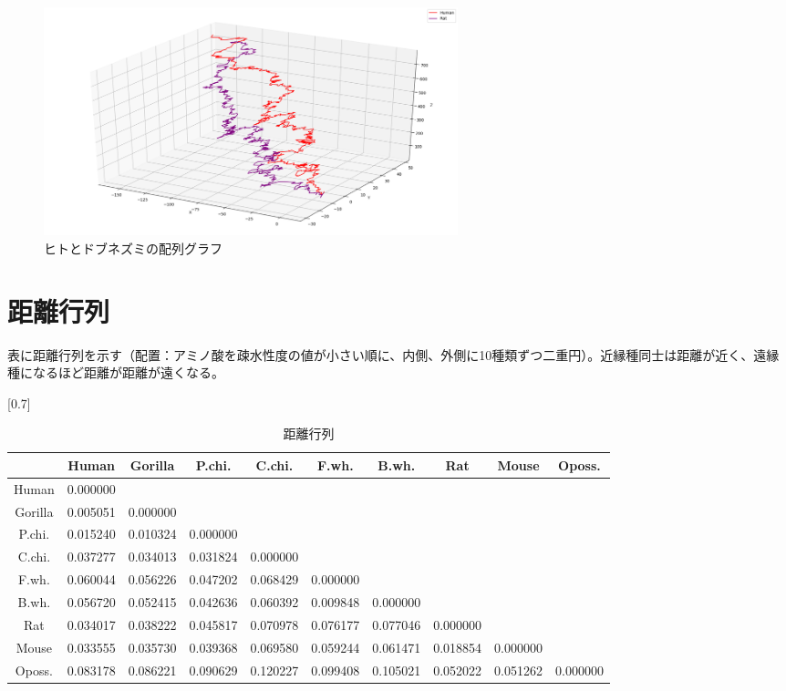 \documentclass[a4paper,12pt]{jsreport}
\begin{document}
\begin{figure}[H]
\centering
\includegraphics[width=120mm]{pic06.png}
\caption{ヒトとドブネズミの配列グラフ}
\end{figure}


\newpage
\section{距離行列}
表に距離行列を示す（配置：アミノ酸を疎水性度の値が小さい順に、内側、外側に10種類ずつ二重円）。近縁種同士は距離が近く、遠縁種になるほど距離が距離が遠くなる。

\begin{table}[H]
\centering
\caption{距離行列}
\scalebox{0.7}[0.7]{
\begin{tabular}{|c|c|c|c|c|c|c|c|c|c|} \hline
 & Human & Gorilla & P.chi. & C.chi. & F.wh. & B.wh. & Rat & Mouse & Oposs. \\ \hline
Human & 0.000000  & &  & & & & & &  \\ 
Gorilla & 0.005051  & 0.000000  & & & & & & &  \\ 
P.chi. & 0.015240  & 0.010324  & 0.000000  & &  & & & &  \\ 
C.chi. & 0.037277  & 0.034013  & 0.031824  & 0.000000  & & & & &  \\
F.wh. & 0.060044  & 0.056226  & 0.047202  & 0.068429  & 0.000000  & & & &  \\ 
B.wh. & 0.056720  & 0.052415  & 0.042636  & 0.060392  & 0.009848  & 0.000000  & & &  \\ 
Rat & 0.034017  & 0.038222  & 0.045817  & 0.070978  & 0.076177  & 0.077046  & 0.000000  & &  \\ 
Mouse & 0.033555  & 0.035730  & 0.039368  & 0.069580  & 0.059244  & 0.061471  & 0.018854  & 0.000000  &  \\ 
Oposs. & 0.083178  & 0.086221  & 0.090629  & 0.120227  & 0.099408  & 0.105021  & 0.052022  & 0.051262  & 0.000000  \\ \hline
\end{tabular}}
\end{table}
\end{document}
